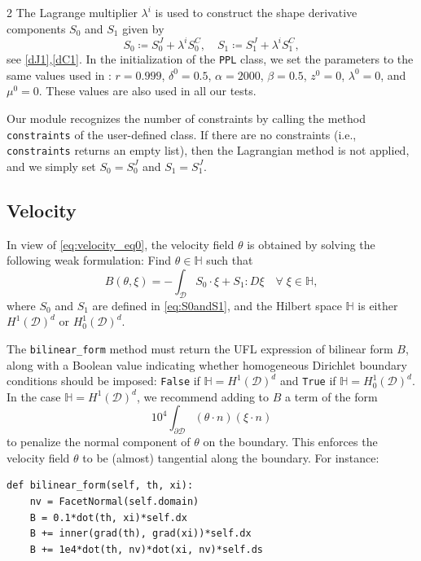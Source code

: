 \documentclass[a4paper, oneside]{article}
\newcommand{\code}[1]{\texttt{#1}}
\begin{document}
\begin{multicols}{2}
The Lagrange multiplier $\lambda^i$ is used to construct
the shape derivative components
$S_0$ and $S_1$ given by
\begin{equation} \label{eq:S0andS1}
S_0 \coloneqq S_0^{J} + \lambda^{i} S_0^{C}, \quad S_1 \coloneqq S_1^{J} + \lambda^{i} S_1^{C}, 	
\end{equation}
see \eqref{dJ1},\eqref{dC1}.
In the initialization of the \code{PPL} class,
we set the parameters to the same values used in \cite{MR4589221}:
$r = 0.999$, $\delta^{0} = 0.5$,
$\alpha = 2000$, $\beta = 0.5$,
$z^{0} = 0$, $\lambda^{0} = 0$, and $\mu^{0} = 0$.
These values are also used in all our tests.

Our module recognizes the number of constraints by calling
the method \code{constraints} of the user-defined class.
If there are no constraints (i.e., \code{constraints} returns an empty list),
then the Lagrangian method is not applied, and we simply set
$S_0 = S_0^J$ and $S_1 = S_1^J$.

\subsection{Velocity}\label{sub:velocity}

In view of \eqref{eq:velocity_eq0}, the velocity field $\theta$ is obtained by solving the following weak formulation:
Find $\theta\in\mathbb{H}$ such that
\begin{equation} \label{eq:velocity}
	B (\theta, \xi) =
	- \int_{\mathcal{D}} S_0\cdot\xi + S_1 : D\xi \quad\forall \; \xi \in \mathbb{H},
\end{equation}
where $S_0$ and $S_1$ are defined in \eqref{eq:S0andS1}, and
the Hilbert space $\mathbb{H}$ is either $H^1(\mathcal{D})^d$ or $H_0^1(\mathcal{D})^d$.

The \code{bilinear\_form} method must return 
the UFL expression of bilinear form $B$, along with
a Boolean value indicating whether homogeneous Dirichlet boundary conditions
should be imposed:
\code{False} if $\mathbb{H} = H^1(\mathcal{D})^d$ and
\code{True} if $\mathbb{H} = H_0^1(\mathcal{D})^d$.
In the case $\mathbb{H} = H^1(\mathcal{D})^d$,
we recommend adding to $B$ a term of the form
\begin{equation}\label{eq:bd_plt}
	{10}^4 \int_{\partial \mathcal{D}}  (\theta \cdot n) (\xi \cdot n)
\end{equation}
to penalize the normal component of $\theta$ on the boundary.
This enforces the velocity field $\theta$ to be
(almost) tangential along the boundary.
For instance:
\begin{lstlisting}
def bilinear_form(self, th, xi):
	nv = FacetNormal(self.domain)
	B = 0.1*dot(th, xi)*self.dx
	B += inner(grad(th), grad(xi))*self.dx
	B += 1e4*dot(th, nv)*dot(xi, nv)*self.ds


\end{lstlisting}
\end{multicols}
\end{document}
